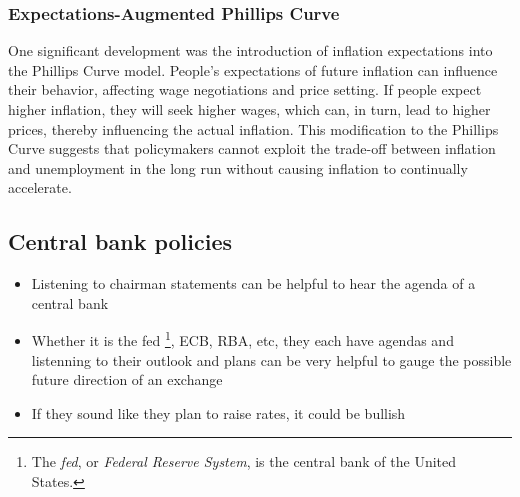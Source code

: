 \documentclass{report}
\begin{document}
     \bigbreak \noindent 
     \subsubsection{Expectations-Augmented Phillips Curve}
     \bigbreak \noindent 
     One significant development was the introduction of inflation expectations into the Phillips Curve model. People's expectations of future inflation can influence their behavior, affecting wage negotiations and price setting. If people expect higher inflation, they will seek higher wages, which can, in turn, lead to higher prices, thereby influencing the actual inflation. This modification to the Phillips Curve suggests that policymakers cannot exploit the trade-off between inflation and unemployment in the long run without causing inflation to continually accelerate.

     \bigbreak \noindent 
     \subsection{Central bank policies}
     \bigbreak \noindent 
     \begin{itemize}
         \item Listening to chairman statements can be helpful to hear the agenda of a central bank
         \item Whether it is the fed \footnote{The \textit{fed}, or \textit{Federal Reserve System}, is the central bank of the United States.}, ECB, RBA, etc, they each have agendas and listenning to their outlook and plans can be very helpful to gauge the possible future direction of an exchange
         \item If they sound like they plan to raise rates, it could be bullish
     \end{itemize}
     \bigbreak \noindent 
\end{document}
